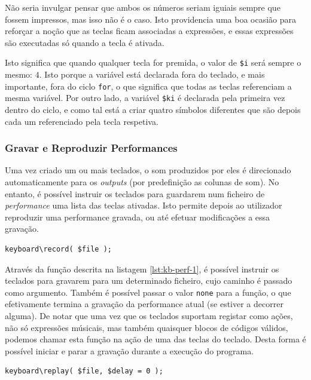 Não seria invulgar pensar que ambos os números seriam iguiais sempre que fossem impressos, mas isso não é o caso. Isto providencia uma boa ocasião para reforçar a noção que as teclas ficam associadas a expressões, e essas expressões são executadas só quando a tecla é ativada.

Isto significa que quando qualquer tecla for premida, o valor de \texttt{\$i} será sempre o mesmo: $4$. Isto porque a variável está declarada fora do teclado, e mais importante, fora do ciclo \texttt{for}, o que significa que todas as teclas referenciam a mesma variável. Por outro lado, a variável \texttt{\$ki} é declarada pela primeira vez dentro do ciclo, e como tal está a criar quatro símbolos diferentes que são depois cada um referenciado pela tecla respetiva.

\subsubsection{Gravar e Reproduzir Performances}
Uma vez criado um ou mais teclados, o som produzidos por eles é direcionado automaticamente para os \textit{outputs} (por predefinição as colunas de som). No entanto, é possível instruir os teclados para guardarem num ficheiro de \textit{performance} uma lista das teclas ativadas. Isto permite depois ao utilizador reproduzir uma performance gravada, ou até efetuar modificações a essa gravação.

\begin{lstlisting}[caption={Gravação de uma \textit{performance}},label={lst:kb-perf-1}]
keyboard\record( $file );
\end{lstlisting}

Através da função descrita na listagem \ref{lst:kb-perf-1}, é possível instruir os teclados para gravarem para um determinado ficheiro, cujo caminho é passado como argumento. Também é possível passar o valor \texttt{none} para a função, o que efetivamente termina a gravação da performance atual (se estiver a decorrer alguma).
De notar que uma vez que os teclados suportam registar como ações, não só expressões músicais, mas também quaisquer blocos de códigos válidos, podemos chamar esta função na ação de uma das teclas do teclado. Desta forma é possível iniciar e parar a gravação durante a execução do programa.

\begin{lstlisting}[caption={Reprodução de uma \textit{performance}},label={lst:kb-perf-2}]
keyboard\replay( $file, $delay = 0 );
\end{lstlisting}

